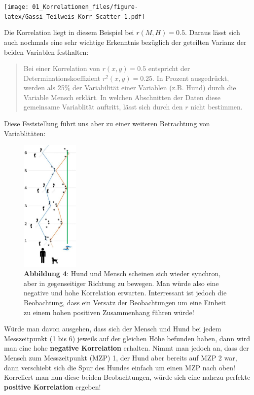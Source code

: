 \documentclass[
]{article}
\begin{document}
\texttt{[image: 01\_Korrelationen\_files/figure-latex/Gassi\_Teilweis\_Korr\_Scatter-1.pdf]}

Die Korrelation liegt in diesem Beispiel bei \(r(M,H) = 0.5\). Daraus lässt sich auch nochmals eine sehr wichtige Erkenntnis bezüglich der geteilten Varianz der beiden Variablen festhalten:

\begin{quote}
Bei einer Korrelation von \(r(x,y) = 0.5\) entspricht der Determinationskoeffizient \(r^2(x,y) = 0.25\). In Prozent ausgedrückt, werden als 25\% der Variabilität einer Variablen (z.B. Hund) durch die Variable Mensch erklärt. In welchen Abschnitten der Daten diese gemeinsame Variablität auftritt, lässt sich durch den \(r\) nicht bestimmen.
\end{quote}

Diese Feststellung führt uns aber zu einer weiteren Betrachtung von Variablitäten:

\begin{figure}
\centering
\includegraphics[width=0.25\textwidth,height=\textheight]{Images/GassiAutokorrKorrelation.JPG}
\caption{\textbf{Abbildung 4}: Hund und Mensch scheinen sich wieder synchron, aber in gegenseitiger Richtung zu bewegen. Man würde also eine negative und hohe Korrelation erwarten. Interressant ist jedoch die Beobachtung, dass ein Versatz der Beobachtungen um eine Einheit zu einem hohen positiven Zusammenhang führen würde!}
\end{figure}

Würde man davon ausgehen, dass sich der Mensch und Hund bei jedem Messzeitpunkt (1 bis 6) jeweils auf der gleichen Höhe befunden haben, dann wird man eine hohe \textbf{negative Korrelation} erhalten. Nimmt man jedoch an, dass der Mensch zum Messzeitpunkt (MZP) 1, der Hund aber bereits auf MZP 2 war, dann verschiebt sich die Spur des Hundes einfach um einen MZP nach oben! Korreliert man nun diese beiden Beobachtungen, würde sich eine nahezu perfekte \textbf{positive Korrelation} ergeben!
\end{document}
